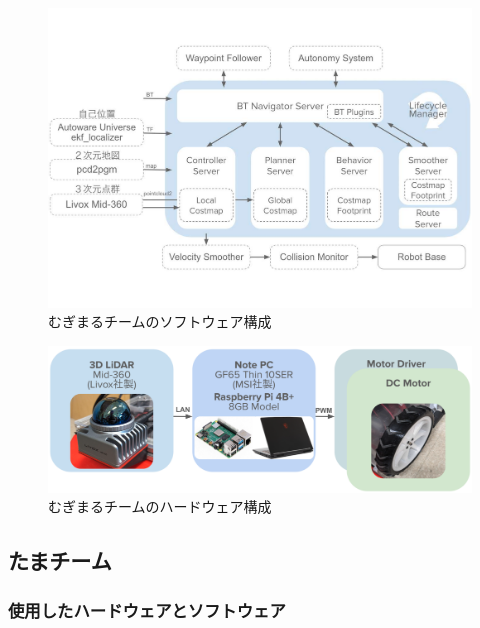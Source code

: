 \documentclass[twocolumn,9pt]{jsproceedings}
\begin{document}
\begin{figure}[h]
  \begin{center}
      \includegraphics[width=1.0\linewidth]{figs/mugimaru_system.pdf}
      \caption{むぎまるチームのソフトウェア構成}
      \label{fig:mugimaru_system}
  \end{center}
\end{figure}

\begin{figure}[h]
  \begin{center}
      \includegraphics[width=1.0\linewidth]{figs/mugimaru_hard.pdf}
      \caption{むぎまるチームのハードウェア構成}
      \label{fig:mugimaru_hard}
  \end{center}
\end{figure}


\subsection{たまチーム}\label{sub:localization}

\subsubsection{使用したハードウェアとソフトウェア}
\end{document}
